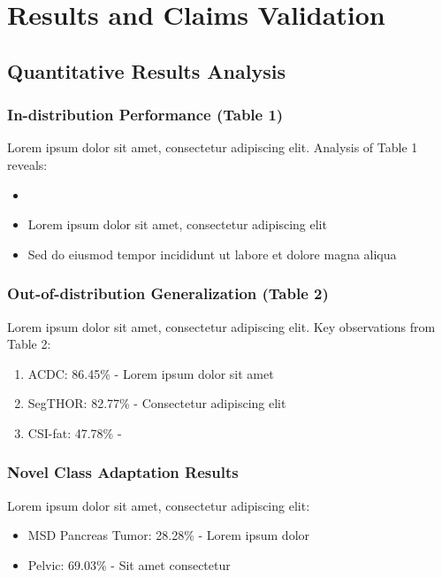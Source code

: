\section{Results and Claims Validation}
\label{sec:results_validation}

\subsection{Quantitative Results Analysis}
\subsubsection{In-distribution Performance (Table 1)}
Lorem ipsum dolor sit amet, consectetur adipiscing elit. Analysis of Table 1 reveals:
\begin{itemize}
    \item {}
    \item Lorem ipsum dolor sit amet, consectetur adipiscing elit
    \item Sed do eiusmod tempor incididunt ut labore et dolore magna aliqua
\end{itemize}

\subsubsection{Out-of-distribution Generalization (Table 2)}
Lorem ipsum dolor sit amet, consectetur adipiscing elit. Key observations from Table 2:
\begin{enumerate}
    \item ACDC: 86.45\% - Lorem ipsum dolor sit amet
    \item SegTHOR: 82.77\% - Consectetur adipiscing elit
    \item CSI-fat: 47.78\% - 
\end{enumerate}

\subsubsection{Novel Class Adaptation Results}
Lorem ipsum dolor sit amet, consectetur adipiscing elit:
\begin{itemize}
    \item MSD Pancreas Tumor: 28.28\% - Lorem ipsum dolor
    \item Pelvic: 69.03\% - Sit amet consectetur
\end{itemize}

